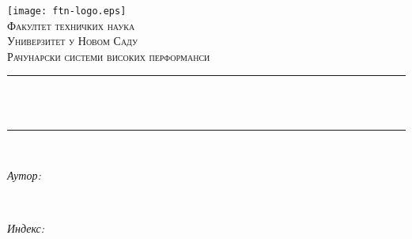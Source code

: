 \begin{titlepage}
	\centering
    \vspace*{0.5 cm}
    \texttt{[image: ftn-logo.eps]}\\[1.0 cm]	                %
    \textsc{\LARGE Факултет техничких наука}\\[0.5 cm]	                    %
	\textsc{\Large Универзитет у Новом Саду}\\[1.0 cm]				        %
	\textsc{\large Рачунарски системи високих перформанси}\\[0.5 cm]		%
	\rule{\linewidth}{0.2 mm} \\[0.4 cm]
	{ \huge \bfseries \thetitle}\\
	\rule{\linewidth}{0.2 mm} \\[1.5 cm]
	
	\begin{minipage}{0.4\textwidth}
		\begin{flushleft} \large
			\emph{Аутор:}\\
			\theauthor
			\end{flushleft}
			\end{minipage}~
			\begin{minipage}{0.4\textwidth}
			\begin{flushright} \large
			\emph{Индекс:} \\
			\theindex								                        %
		\end{flushright}
	\end{minipage}\\[2.0 cm]
	
	{\large \thedate}\\[2 cm]
	\vfill
\end{titlepage}